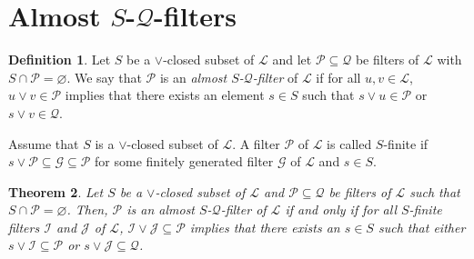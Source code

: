 \documentclass[preprint,review,10pt]{amsart}
\newtheorem{theorem}{Theorem}[section]
\theoremstyle{definition}
\newtheorem{definition}[theorem]{Definition}
\theoremstyle{remark}
\numberwithin{equation}{section}
\begin{document}
\section{Almost $S$-$\mathcal{Q}$-filters}
\begin{definition}
Let $S$ be a $\vee$-closed subset of $\mathcal{L}$ and let $\mathcal{P} \subseteq \mathcal{Q}$ be filters of $\mathcal{L}$ with $S \cap \mathcal{P}=\varnothing$. We say that $\mathcal{P}$ is   an {\it almost $S$-$\mathcal{Q}$-filter} of  $\mathcal{L}$ if  for all $u,v \in \mathcal{L}$,  $u \vee v \in \mathcal{P}$ implies that there exists an element $s \in S$ such that $s \vee u \in \mathcal{P}$ or $s \vee v \in \mathcal{Q}$. 
\end{definition}
Assume that $S$ is a $\vee$-closed subset of $\mathcal{L}$. A filter $\mathcal{P}$ of $\mathcal{L}$  is called $S$-finite if $s \vee \mathcal{P} \subseteq \mathcal{G} \subseteq \mathcal{P}$ for some finitely generated filter $\mathcal{G}$ of $\mathcal{L}$ and $s \in S$.
\begin{theorem} \label{31}
Let $S$ be a $\vee$-closed subset of $\mathcal{L}$ and  $\mathcal{P} \subseteq \mathcal{Q}$ be filters of $\mathcal{L}$ such that  $S \cap \mathcal{P}=\varnothing$. Then,  $\mathcal{P}$ is an  almost $S$-$\mathcal{Q}$-filter of $\mathcal{L}$ if and only if  
 for all $S$-finite filters $\mathcal{I}$ and $\mathcal{J}$  of $\mathcal{L}$, $\mathcal{I} \vee \mathcal{J} \subseteq \mathcal{P}$ implies that there exists an $s \in S$ such that either  $s \vee \mathcal{I}  \subseteq \mathcal{P} $ or $s \vee \mathcal{J} \subseteq \mathcal{Q}$.
\end{theorem}
\end{document}
